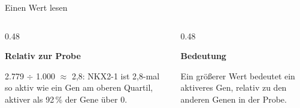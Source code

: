 \documentclass[aspectratio=169,11pt]{beamer}
\newcommand{\kastentitel}[1]{{\color{blau}\textbf{#1}}\par\smallskip}
\begin{document}
\begin{frame}{Einen Wert lesen}
  \vspace{0.15cm}
  \begin{columns}[t]
    \begin{column}{0.48\textwidth}
      \begin{kasten}
        \kastentitel{Relativ zur Probe}
        \footnotesize 2.779 $\div$ 1.000 $\approx$ 2,8: NKX2-1 ist 2,8-mal so aktiv wie ein Gen am oberen Quartil, aktiver als 92\,\% der Gene über 0.
      \end{kasten}
    \end{column}
    \begin{column}{0.48\textwidth}
      \begin{kasten}
        \kastentitel{Bedeutung}
        \footnotesize Ein größerer Wert bedeutet ein aktiveres Gen, relativ zu den anderen Genen in der Probe.
      \end{kasten}
    \end{column}
  \end{columns}
\end{frame}
\end{document}
